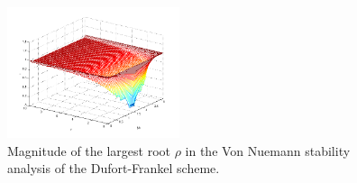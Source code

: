 \documentclass[11pt]{article}
\begin{document}
\begin{enumerate}


\begin{figure}[t!]
  \centering
    \includegraphics[width=0.45\textwidth]{andy_hw13_prb07_01.png}
  \caption{Magnitude of the largest root $\rho$ in the Von Nuemann stability analysis of the Dufort-Frankel scheme.}
\end{figure}

\end{enumerate}
\end{document}
